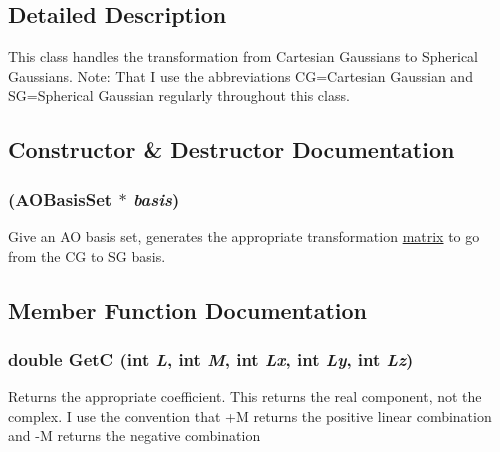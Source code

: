 \subsection{Detailed Description}
This class handles the transformation from Cartesian Gaussians to Spherical Gaussians. Note: That I use the abbreviations CG=Cartesian Gaussian and SG=Spherical Gaussian regularly throughout this class. 

\subsection{Constructor \& Destructor Documentation}
\hypertarget{classJKBuilder_1_1CG2SG_a3dd17ea7b07cd7d20b0c21010b56eb04}{
\subsubsection[{CG2SG}]{ ({\bf AOBasisSet} $\ast$ {\em basis})}}
\label{classJKBuilder_1_1CG2SG_a3dd17ea7b07cd7d20b0c21010b56eb04}


Give an AO basis set, generates the appropriate transformation \hyperlink{classJKBuilder_1_1matrix}{matrix} to go from the CG to SG basis. 

\subsection{Member Function Documentation}
\hypertarget{classJKBuilder_1_1CG2SG_a755586288e38b18e91f6e2437f979789}{
\subsubsection[{GetC}]{\setlength{\rightskip}{0pt plus 5cm}double GetC (int {\em L}, \/  int {\em M}, \/  int {\em Lx}, \/  int {\em Ly}, \/  int {\em Lz})}}
\label{classJKBuilder_1_1CG2SG_a755586288e38b18e91f6e2437f979789}


Returns the appropriate coefficient. This returns the real component, not the complex. I use the convention that +M returns the positive linear combination and -\/M returns the negative combination


